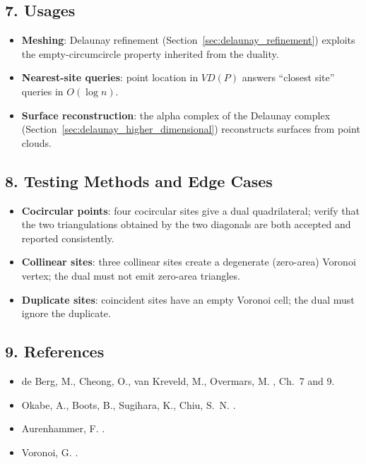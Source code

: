 \subsection{7. Usages}

\begin{itemize}
\item \textbf{Meshing}: Delaunay refinement (Section~\ref{sec:delaunay_refinement})
  exploits the empty-circumcircle property inherited from the duality.
\item \textbf{Nearest-site queries}: point location in $VD(P)$ answers
  ``closest site'' queries in $O(\log n)$.
\item \textbf{Surface reconstruction}: the alpha complex of the Delaunay
  complex (Section~\ref{sec:delaunay_higher_dimensional}) reconstructs surfaces
  from point clouds.
\end{itemize}

\subsection{8. Testing Methods and Edge Cases}

\begin{itemize}
\item \textbf{Cocircular points}: four cocircular sites give a dual
  quadrilateral; verify that the two triangulations obtained by the two
  diagonals are both accepted and reported consistently.
\item \textbf{Collinear sites}: three collinear sites create a degenerate
  (zero-area) Voronoi vertex; the dual must not emit zero-area triangles.
\item \textbf{Duplicate sites}: coincident sites have an empty Voronoi cell;
  the dual must ignore the duplicate.
\end{itemize}

\subsection{9. References}

\begin{itemize}
\item de Berg, M., Cheong, O., van Kreveld, M., Overmars, M. \cite{deberg2008},
  Ch.~7 and 9.
\item Okabe, A., Boots, B., Sugihara, K., Chiu, S.~N. \cite{okabe2000}.
\item Aurenhammer, F. \cite{aurenhammer1991}.
\item Voronoi, G. \cite{voronoi1908}.
\end{itemize}


